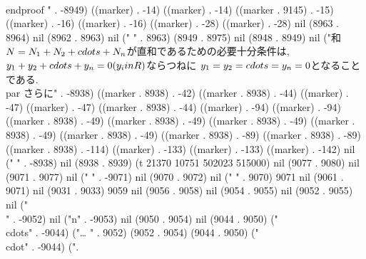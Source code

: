 \\end{proof}
" . -8949) ((marker) . -14) ((marker) . -14) ((marker . 9145) . -15) ((marker) . -16) ((marker) . -16) ((marker) . -28) ((marker) . -28) nil (8963 . 8964) nil (8962 . 8963) nil (" " . 8963) (8949 . 8975) nil (8948 . 8949) nil ("和$N=N_{1}+N_{2}+\\cdots+N_{n}$が直和であるための必要十分条件は,
 $y_{1}+y_{2}+\\cdots+y_{n}=0(y_{i}\\in R)$ならつねに
 $y_{1}=y_{2}=\\cdots=y_{n}=0$となることである.
 \\par さらに" . -8938) ((marker . 8938) . -42) ((marker . 8938) . -44) ((marker) . -47) ((marker) . -47) ((marker . 8938) . -44) ((marker) . -94) ((marker) . -94) ((marker . 8938) . -49) ((marker . 8938) . -49) ((marker . 8938) . -49) ((marker . 8938) . -49) ((marker . 8938) . -49) ((marker . 8938) . -89) ((marker . 8938) . -89) ((marker . 8938) . -114) ((marker) . -133) ((marker) . -133) ((marker) . -142) nil (" " . -8938) nil (8938 . 8939) (t 21370 10751 502023 515000) nil (9077 . 9080) nil (9071 . 9077) nil (" " . -9071) nil (9070 . 9072) nil (" " . 9070) 9071 nil (9061 . 9071) nil (9031 . 9033) 9059 nil (9056 . 9058) nil (9054 . 9055) nil (9052 . 9055) nil ("\\" . -9052) nil ("n" . -9053) nil (9050 . 9054) nil (9044 . 9050) ("\\cdots" . -9044) ("…
" . 9052) (9052 . 9054) (9044 . 9050) ("\\cdot" . -9044) (".
